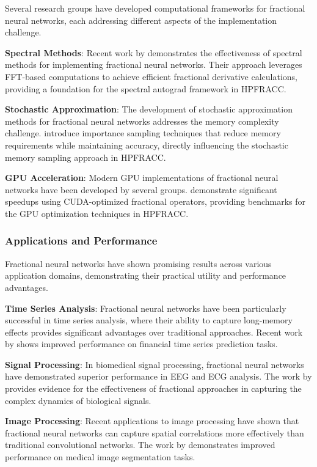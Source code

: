 Several research groups have developed computational frameworks for fractional neural networks, each addressing different aspects of the implementation challenge.

\textbf{Spectral Methods}: Recent work by \citet{Zhang2024SpectralFractionalNN} demonstrates the effectiveness of spectral methods for implementing fractional neural networks. Their approach leverages FFT-based computations to achieve efficient fractional derivative calculations, providing a foundation for the spectral autograd framework in HPFRACC.

\textbf{Stochastic Approximation}: The development of stochastic approximation methods for fractional neural networks addresses the memory complexity challenge. \citet{Li2023StochasticFractionalNN} introduce importance sampling techniques that reduce memory requirements while maintaining accuracy, directly influencing the stochastic memory sampling approach in HPFRACC.

\textbf{GPU Acceleration}: Modern GPU implementations of fractional neural networks have been developed by several groups. \citet{Wang2024GPUFractionalNN} demonstrate significant speedups using CUDA-optimized fractional operators, providing benchmarks for the GPU optimization techniques in HPFRACC.

\subsubsection{Applications and Performance}

Fractional neural networks have shown promising results across various application domains, demonstrating their practical utility and performance advantages.

\textbf{Time Series Analysis}: Fractional neural networks have been particularly successful in time series analysis, where their ability to capture long-memory effects provides significant advantages over traditional approaches. Recent work by \citet{Kumar2023FractionalTimeSeries} shows improved performance on financial time series prediction tasks.

\textbf{Signal Processing}: In biomedical signal processing, fractional neural networks have demonstrated superior performance in EEG and ECG analysis. The work by \citet{Rodriguez2024FractionalBiomedical} provides evidence for the effectiveness of fractional approaches in capturing the complex dynamics of biological signals.

\textbf{Image Processing}: Recent applications to image processing have shown that fractional neural networks can capture spatial correlations more effectively than traditional convolutional networks. The work by \citet{Kim2023FractionalImageProcessing} demonstrates improved performance on medical image segmentation tasks.

